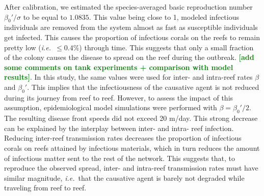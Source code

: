 \documentclass[utf8]{frontiersSCNS}
\newcommand{\ie}{{\it i.e.}\ }
\newcommand{\erinn}[1]{\textbf{\textcolor{green}{#1}}}
\newcommand{\dobby}[1]{\textbf{\color{violet}{#1}}}
\begin{document}

After calibration, we estimated the species-averaged basic reproduction number $\beta_0'/\sigma$ to be equal to $1.0835$. This value being close to 1, modeled infectious individuals are removed from the system almost as fast as susceptible individuals get infected. This causes the proportion of infectious corals on the reefs to remain pretty low (\ie $\leq 0.4\%$) through time. This suggests that only a small fraction of the colony causes the disease to spread on the reef during the outbreak. \erinn{[add some comments on tank experiments + comparison with model results]}. In this study, the same values were used for inter- and intra-reef rates $\beta$ and $\beta_0'$. This implies that the infectiousness of the causative agent is not reduced during its journey from reef to reef. However, to assess the impact of this assumption, epidemiological model simulations were performed with $\beta=\beta_0'/2$. The resulting disease front speeds did not exceed 20 m/day. This strong decrease can be explained by the interplay between inter- and intra- reef infection. Reducing inter-reef transmission rates decreases the proportion of infectious corals on reefs attained by infectious materials, which in turn reduces the amount of infectious matter sent to the rest of the network. This suggests that, to reproduce the observed spread, inter- and intra-reef transmission rates must have similar magnitude, \ie that the causative agent is barely not degraded while traveling from reef to reef. \dobby{Is this consistent with Rhodobacterales and Rhizobiales ?}

\end{document}
